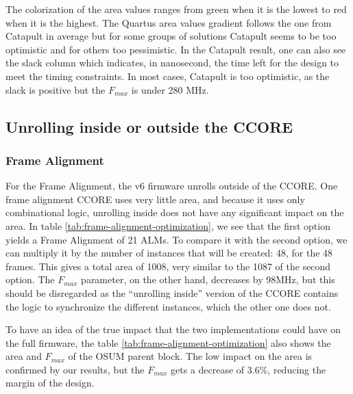 The colorization of the area values ranges from green when it is the lowest to red when it is the highest. The Quartus area values gradient follows the one from Catapult in average but for some groups of solutions Catapult seems to be too optimistic and for others too pessimistic. In the Catapult result, one can also see the slack column which indicates, in nanosecond, the time left for the design to meet the timing constraints. In most cases, Catapult is too optimistic, as the slack is positive but the \(F_{max}\) is under 280 MHz. 







\subsection{Unrolling inside or outside the CCORE}


\subsubsection{Frame Alignment}

For the Frame Alignment, the v6 firmware unrolls outside of the CCORE. One frame alignment CCORE uses very little area, and because it uses only combinational logic, unrolling inside does not have any significant impact on the area. In table \ref{tab:frame-alignment-optimization}, we see that the first option yields a Frame Alignment of 21 ALMs. To compare it with the second option, we can multiply it by the number of instances that will be created: 48, for the 48 frames. This gives a total area of 1008, very similar to the 1087 of the second option. The \(F_{max}\) parameter, on the other hand, decreases by 98MHz, but this should be disregarded as the ``unrolling inside'' version of the CCORE contains the logic to synchronize the different instances, which the other one does not.

To have an idea of the true impact that the two implementations could have on the full firmware, the table \ref{tab:frame-alignment-optimization} also shows the area and \(F_{max}\) of the OSUM parent block. The low impact on the area is confirmed by our results, but the \(F_{max}\) gets a decrease of 3.6\%, reducing the margin of the design.

